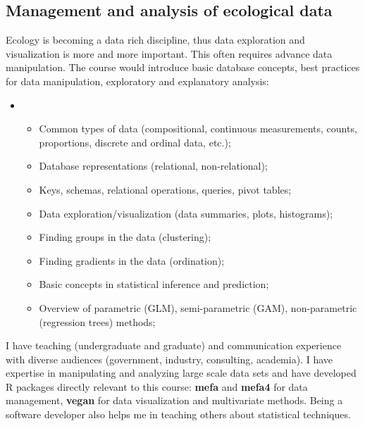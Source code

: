 
\subsection{Management and analysis of ecological data} %

Ecology is becoming a data rich discipline, thus data exploration and visualization is more and more important. This often requires advance data manipulation. The course would introduce basic database concepts, best practices for data manipulation, exploratory and explanatory analysis:
\vspace{0.3pc}

\begin{itemize}%
\item[]%
\begin{itemize}%
  \item Common types of data (compositional, continuous measurements, counts, proportions, discrete and ordinal data, etc.); 
  \item Database representations (relational, non-relational); 
  \item Keys, schemas, relational operations, queries, pivot tables; 
  \item Data exploration/visualization (data summaries, plots, histograms); 
  \item Finding groups in the data (clustering); 
  \item Finding gradients in the data (ordination); 
  \item Basic concepts in statistical inference and prediction; 
  \item Overview of parametric (GLM), semi-parametric (GAM), non-parametric (regression trees) methods;
\end{itemize}%
\end{itemize}%
\vspace{0.5pc}

I have teaching (undergraduate and graduate) and communication experience with diverse audiences (government, industry, consulting, academia). I have expertise in manipulating and analyzing large scale data sets and have developed R packages directly relevant to this course: \textbf{mefa} and \textbf{mefa4} for data management, \textbf{vegan} for data visualization and multivariate methods. Being a software developer also helps me in teaching others about statistical techniques. 
\vspace{0.5pc}

